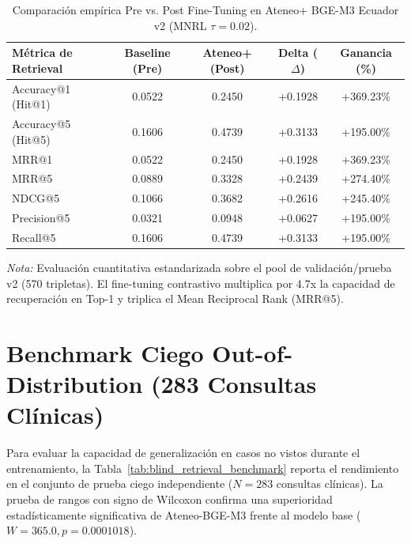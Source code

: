 \documentclass[10pt,journal,compsoc]{IEEEtran}
\begin{document}
\begin{table}[htbp]
\centering
\caption{Comparación empírica Pre vs. Post Fine-Tuning en Ateneo+ BGE-M3 Ecuador v2 (MNRL $\tau=0.02$).}
\label{tab:pre_post_retrieval}
\begin{tabular}{lcccc}
\toprule
\textbf{Métrica de Retrieval} & \textbf{Baseline (Pre)} & \textbf{Ateneo+ (Post)} & \textbf{Delta ($\Delta$)} & \textbf{Ganancia (\%)} \\
\midrule
    Accuracy@1 (Hit@1) & 0.0522 & 0.2450 & +0.1928 & +369.23\% \\
    Accuracy@5 (Hit@5) & 0.1606 & 0.4739 & +0.3133 & +195.00\% \\
    MRR@1 & 0.0522 & 0.2450 & +0.1928 & +369.23\% \\
    MRR@5 & 0.0889 & 0.3328 & +0.2439 & +274.40\% \\
    NDCG@5 & 0.1066 & 0.3682 & +0.2616 & +245.40\% \\
    Precision@5 & 0.0321 & 0.0948 & +0.0627 & +195.00\% \\
    Recall@5 & 0.1606 & 0.4739 & +0.3133 & +195.00\% \\
\bottomrule
\end{tabular}
\vspace{1mm}
\begin{minipage}{\linewidth}
\footnotesize
\textit{Nota:} Evaluación cuantitativa estandarizada sobre el pool de validación/prueba v2 (570 tripletas). El fine-tuning contrastivo multiplica por 4.7x la capacidad de recuperación en Top-1 y triplica el Mean Reciprocal Rank (MRR@5).
\end{minipage}
\end{table}

\section{Benchmark Ciego Out-of-Distribution (283 Consultas Clínicas)}

Para evaluar la capacidad de generalización en casos no vistos durante el entrenamiento, la Tabla~\ref{tab:blind_retrieval_benchmark} reporta el rendimiento en el conjunto de prueba ciego independiente ($N=283$ consultas clínicas). La prueba de rangos con signo de Wilcoxon confirma una superioridad estadísticamente significativa de Ateneo-BGE-M3 frente al modelo base ($W=365.0, p=0.0001018$).
\end{document}
